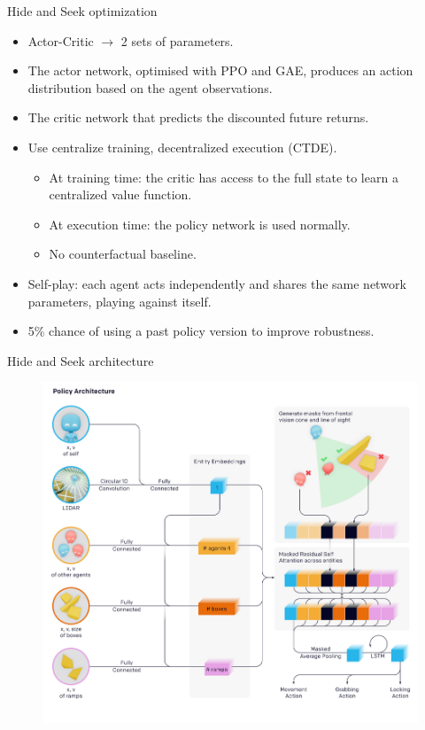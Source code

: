 \documentclass{beamer}
\begin{document}
\begin{frame}{Hide and Seek optimization}
    \begin{itemize}
        \item Actor-Critic $\rightarrow$ 2 sets of parameters.
        \item The actor network, optimised with PPO and GAE, produces an action distribution based on the agent observations.
        \item The critic network that predicts the discounted future returns.
        \item Use centralize training, decentralized execution (CTDE).
        \begin{itemize}
            \item At training time: the critic has access to the full state to learn a centralized value function.
            \item At execution time: the policy network is used normally.
            \item No counterfactual baseline.
        \end{itemize}{}
        \item Self-play: each agent acts independently and shares the same network parameters, playing against itself.
        \item 5\% chance of using a past policy version to improve robustness.
    \end{itemize}{}
\end{frame}{}

\begin{frame}{Hide and Seek architecture}
    \begin{figure}
    \centering
    \includegraphics[scale=0.25]{hasarch.png}
    \end{figure}
\end{frame}{}
\end{document}
